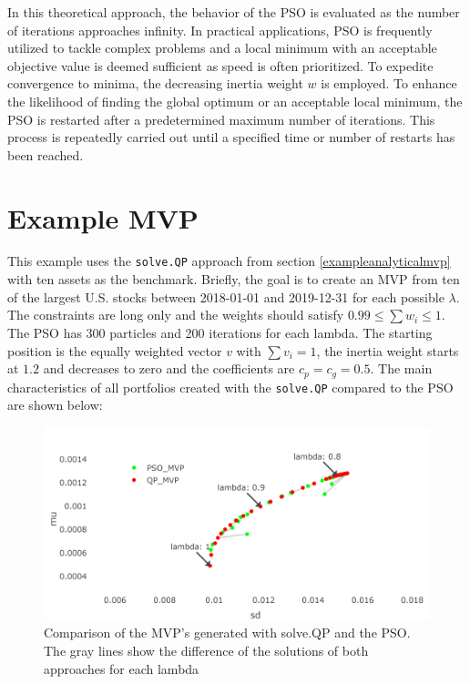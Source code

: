 \documentclass[
  oneside, a4paper, 12pt, openany]{book}
\theoremstyle{definition}
\theoremstyle{definition}
\theoremstyle{definition}
\theoremstyle{definition}
\theoremstyle{remark}
\begin{document}
In this theoretical approach, the behavior of the PSO is evaluated as the number of iterations approaches infinity. In practical applications, PSO is frequently utilized to tackle complex problems and a local minimum with an acceptable objective value is deemed sufficient as speed is often prioritized. To expedite convergence to minima, the decreasing inertia weight \(w\) is employed. To enhance the likelihood of finding the global optimum or an acceptable local minimum, the PSO is restarted after a predetermined maximum number of iterations. This process is repeatedly carried out until a specified time or number of restarts has been reached.

\hypertarget{example-mvp-1}{%
\section{Example MVP}\label{example-mvp-1}}

This example uses the \texttt{solve.QP} approach from section \ref{exampleanalyticalmvp} with ten assets as the benchmark. Briefly, the goal is to create an MVP from ten of the largest U.S. stocks between 2018-01-01 and 2019-12-31 for each possible \(\lambda\). The constraints are long only and the weights should satisfy \(0.99 \leq \textstyle\sum w_i \leq 1\). The PSO has 300 particles and 200 iterations for each lambda. The starting position is the equally weighted vector \(v\) with \(\textstyle\sum v_i=1\), the inertia weight starts at \(1.2\) and decreases to zero and the coefficients are \(c_p=c_g=0.5\). The main characteristics of all portfolios created with the \texttt{solve.QP} compared to the PSO are shown below:

\vspace{-0,1cm}
\begin{figure}[H]
\includegraphics{Master_Thesis_files/figure-latex/pso7-1} \caption{Comparison of the MVP's generated with solve.QP and the PSO. The gray lines show the difference of the solutions of both approaches for each lambda}\label{fig:pso7}
\end{figure}
\end{document}
